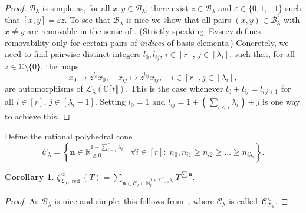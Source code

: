 \documentclass[11pt]{amsart}
\numberwithin{equation}{section}
\numberwithin{figure}{section}
\theoremstyle{plain}
\newtheorem{corollary}[theorem]{Corollary}
\theoremstyle{definition}
\theoremstyle{remark}
\begin{document}
\begin{proof}
  ${\mathcal{B}}_{\lambda}$ is simple as, for all $x,y\in{\mathcal{B}}_\lambda$, there
  exist $z\in {\mathcal{B}}_\lambda$ and $\varepsilon\in\{0,1,-1\}$ such that
  $[x,y]= \varepsilon z$. To see that ${\mathcal{B}}_{\lambda}$ is nice we show
  that all pairs $(x,y)\in{\mathcal{B}}_\lambda^2$ with $x\neq y$ are removable
  in the sense of \cite[Section~3]{Evseev/09}. (Strictly speaking,
  Evseev defines removability only for certain pairs of \emph{indices}
  of basis elements.) Concretely, we need to find pairwise distinct
  integers $l_0,l_{ij}$, $i\in[r]$, $j\in[\lambda_i]$, such that, for
  all $z\in\mathbb{C}\setminus \{0\}$, the maps
$$x_0 \mapsto z^{l_0}x_0, \quad x_{ij} \mapsto z^{l_{ij}}x_{ij}, \quad
i\in[r], j\in[\lambda_i],$$ are automorphisms of
${\ensuremath{\mathcal{L}}}_{\lambda}(\mathbb{C}\llbracket t\rrbracket)$. This is the case
whenever $l_0 + l_{ij} = l_{i\,j+1}$ for all $i\in[r]$,
$j\in[\lambda_i-1]$. Setting $l_0=1$ and $l_{ij}=1 + \left(\sum_{\iota
    < i}\lambda_\iota\right) + j$ is one way to achieve this.
\end{proof}

Define the rational polyhedral cone
\begin{equation}\label{def:cone}
  {{\mathcal{C}}}_{\lambda} =  \left\{
    {\ensuremath{\mathbf{n}}}\in{\ensuremath{\mathbb{R}}}_{\geq0}^{1+\sum_{i=1}^r \lambda_i} \mid \forall
    i\in[r]:\;n_0,n_{i1}\geq n_{i2}\geq \dots \geq n_{i\lambda_i}\right\}.
\end{equation}

\begin{corollary}
  $\zeta^{\triangleleft}_{{\ensuremath{\mathcal{L}}}_\lambda,\operatorname{red}}(T) =
  \sum_{{\ensuremath{\mathbf{n}}}\in{{\mathcal{C}}}_{\lambda}\cap
    {\ensuremath{\mathbb{N}}}_0^{1+\sum_{i=1}^r\lambda_i}}T^{\sum {\ensuremath{\mathbf{n}}}}.$
\end{corollary}

\begin{proof} 
  As ${\mathcal{B}}_{\lambda}$ is nice and simple, this follows
  from~\cite[Proposition~4.1]{Evseev/09}, where ${{\mathcal{C}}}_{\lambda}$ is
  called~${{\mathcal{C}}}_{{\mathcal{B}}_{\lambda}}^{\triangleleft}$.
\end{proof}
\end{document}
